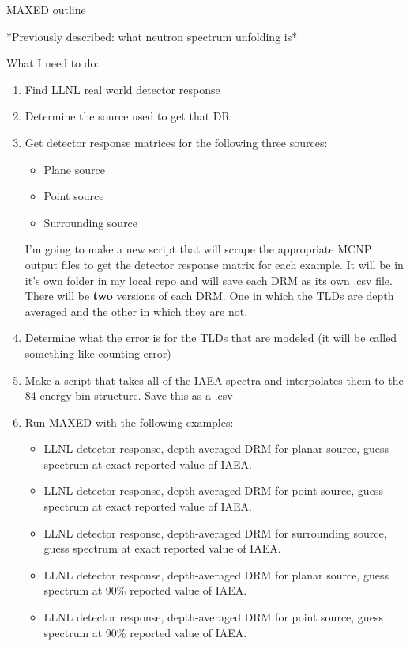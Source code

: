 \documentclass[11pt]{article}
\begin{document}
\begin{center}
MAXED outline
\end{center}
*Previously described: what neutron spectrum unfolding is*\\

\hfill


What I need to do:
\begin{enumerate}
\item Find LLNL real world detector response
\item Determine the source used to get that DR
\item Get detector response matrices for the following three sources:
\begin{itemize}
\item[\checkmark] Plane source
\item Point source
\item[\checkmark] Surrounding source
\end{itemize}
I'm going to make a new script that will scrape the appropriate MCNP output files to get the detector response matrix for each example. It will be in it's own folder in my local repo and will save each DRM as its own .csv file. There will be \textbf{two} versions of each DRM. One in which the TLDs are depth averaged and the other in which they are not.
\item Determine what the error is for the TLDs that are modeled (it will be called something like counting error)
\item Make a script that takes all of the IAEA spectra and interpolates them to the 84 energy bin structure. Save this as a .csv
\item Run MAXED with the following examples:
	\begin{itemize}
	\item LLNL detector response, depth-averaged DRM for planar source, guess spectrum at exact reported value of IAEA.
	\item LLNL detector response, depth-averaged DRM for point source, guess spectrum at exact reported value of IAEA.
	\item LLNL detector response, depth-averaged DRM for surrounding source, guess spectrum at exact reported value of IAEA.
	\item LLNL detector response, depth-averaged DRM for planar source, guess spectrum at 90\% reported value of IAEA.
	\item LLNL detector response, depth-averaged DRM for point source, guess spectrum at 90\% reported value of IAEA.

\end{itemize}
\end{enumerate}
\end{document}
